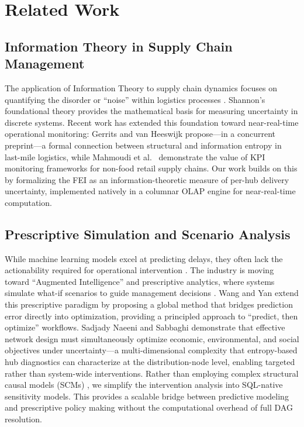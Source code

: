 \documentclass[conference]{IEEEtran}
\begin{document}
\section{Related Work}

\subsection{Information Theory in Supply Chain Management}
The application of Information Theory to supply chain dynamics focuses on quantifying the disorder or ``noise'' within logistics processes \cite{shannon1948mathematical}. Shannon's foundational theory provides the mathematical basis for measuring uncertainty in discrete systems. Recent work has extended this foundation toward near-real-time operational monitoring: Gerrits and van Heeswijk \cite{gerrits2026entropy} propose---in a concurrent preprint---a formal connection between structural and information entropy in last-mile logistics, while Mahmoudi et al.\ \cite{mahmoudi2026real} demonstrate the value of KPI monitoring frameworks for non-food retail supply chains. Our work builds on this by formalizing the FEI as an information-theoretic measure of per-hub delivery uncertainty, implemented natively in a columnar OLAP engine for near-real-time computation.

\subsection{Prescriptive Simulation and Scenario Analysis}
While machine learning models excel at predicting delays, they often lack the actionability required for operational intervention \cite{culot2024artificial}. The industry is moving toward ``Augmented Intelligence'' and prescriptive analytics, where systems simulate what-if scenarios to guide management decisions \cite{lepenioti2020prescriptive}. Wang and Yan \cite{wang2022global} extend this prescriptive paradigm by proposing a global method that bridges prediction error directly into optimization, providing a principled approach to ``predict, then optimize'' workflows. Sadjady Naeeni and Sabbaghi \cite{sadjady2022sustainable} demonstrate that effective network design must simultaneously optimize economic, environmental, and social objectives under uncertainty---a multi-dimensional complexity that entropy-based hub diagnostics can characterize at the distribution-node level, enabling targeted rather than system-wide interventions. Rather than employing complex structural causal models (SCMs) \cite{pearl2009causality}, we simplify the intervention analysis into SQL-native sensitivity models. This provides a scalable bridge between predictive modeling and prescriptive policy making without the computational overhead of full DAG resolution.
\end{document}
